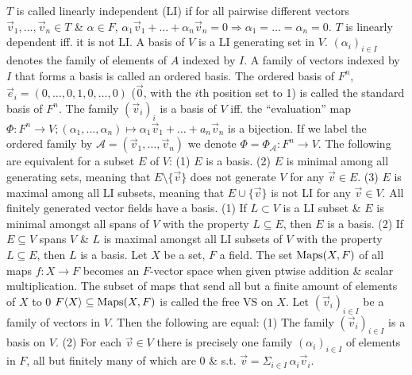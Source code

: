  $T$ is called linearly independent (LI) if for all pairwise different vectors $\vec{v}_{1},\dots,\vec{v}_{n} \in T$ \& $\alpha \in F$, $\alpha_{1}\vec{v}_{1} + \dots + \alpha_{n}\vec{v}_{n} = 0 \Rightarrow \alpha_{1} = \dots = \alpha_{n} = 0$.
 $T$ is linearly dependent iff. it is not LI.
 A basis of $V$ is a LI generating set in $V$.
 $(\alpha_{i})_{i \in I}$ denotes the family of elements of $A$ indexed by $I$.
 A family of vectors indexed by $I$ that forms a basis is called an ordered basis.
 The ordered basis of $F^{n}$, $\vec{e}_{i} = (0,\dots,0,1,0,\dots,0)$ ($\vec{0}$, with the $i$th position set to 1) is called the standard basis of $F^{n}$.
 The family $(\vec{v}_{i})_{i}$ is a basis of $V$ iff. the ``evaluation'' map $\Phi : F^{n} \to V; (\alpha_{1}, \dots, \alpha_{n}) \mapsto \alpha_{1}\vec{v}_{1} + \dots + a_{n}\vec{v}_{n}$ is a bijection. If we label the ordered family by $\mathcal{A} = (\vec{v}_{1}, \dots, \vec{v}_{n})$ we denote $\Phi = \Phi_{\mathcal{A}} : F^{n} \to V$.
 The following are equivalent for a subset $E$ of $V$:
(1) $E$ is a basis.
(2) $E$ is minimal among all generating sets, meaning that $E \setminus \{\vec{v}\}$ does not generate $V$ for any $\vec{v} \in E$.
(3) $E$ is maximal among all LI subsets, meaning that $E \cup \{\vec{v}\}$ is not LI for any $\vec{v} \in V$.
 All finitely generated vector fields have a basis.
(1) If $L \subset V$ is a LI subset \& $E$ is minimal amongst all spans of $V$ with the property $L \subseteq E$, then $E$ is a basis.
(2) If $E \subseteq V$ spans $V$ \& $L$ is maximal amongst all LI subsets of $V$ with the property $L \subseteq E$, then $L$ is a basis.
 Let $X$ be a set, $F$ a field. The set $\text{Maps}(X,F)$ of all maps $f : X \to F$ becomes an $F$-vector space when given ptwise addition \& scalar multiplication. The subset of maps that send all but a finite amount of elements of $X$ to 0 $F \langle X \rangle \subseteq \text{Maps}(X, F)$ is called the free VS on $X$.
 Let $(\vec{v}_{i})_{i \in I}$ be a family of vectors in $V$. Then the following are equal:
(1) The family $(\vec{v}_{i})_{i \in I}$ is a basis on $V$.
(2) For each $\vec{v} \in V$ there is precisely one family $(\alpha_{i})_{i \in I}$ of elements in $F$, all but finitely many of which are 0 \& s.t. $\vec{v} = \Sigma_{i \in I} \, \alpha_{i}\vec{v}_{i}$.

